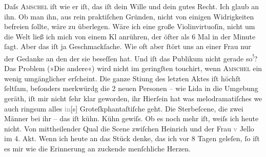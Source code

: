 \pstart
           Daſs \textsc{Amschel} iſt wie er iſt, das iſt dein Wille und dein gutes Recht. Ich glaub an ihn. Ob
               man ihn, aus rein praktiſchen Gründen, nicht von einigen Widrigkeiten befreien{ }ſollte,  wäre zu überlegen. Wäre ich eine große
               Violinvirtuoſin, nicht um die Welt ließ ich mich von einem Kl anrühren, der öfter als 6 Mal in der Minute \label{K_L01534-2v}\label{K_L01534-2}{ }ſagt. Aber das iſt ja Geschmackſache. Wie oft aber{ }ſtört uns an einer {\pb}Frau nur der Gedanke an den der sie beseſſen hat. Und iſt das Publikum nicht gerade so\substVorne{}\textsuperscript{!}\substDazwischen{}?\substHinten{} Das Problem (»Die andere«) wird nicht
               im geringſten touchirt, wenn \textsc{Amschel} ein wenig umgänglicher erſcheint. Die ganze Sti{\geminationm}ung des letzten Aktes iſt höchſt{ }ſeltſam, beſonders merkwürdg die 2 neuen Personen
               – wie Lida in die Umgebung
               geräth, iſt mir nicht{ }ſehr klar geworden,  ihr
               Hierſein hat was melodramatiſches {\pb}we{\geminationn} auch ringsum alles
                  \textcolor{gray}{in}{[}s{]} Groteſkphantaſtiſche geht. Die Sterbeſcene, die zwei Männer
               bei ihr – das iſt kühn. Kühn gewiſs. Ob es noch mehr iſt, weiſs ich heute nicht. Von
               mittheilender Qual die Scene
               zwiſchen Heinrich und der Frau \textcolor{gray}{v} Jello
               im 4. Akt. Wenn ich heute an das Stück denke, das ich vor 8 Tagen geleſen,{ }ſo iſt es
               mir wie die Erinnerung an zuckende menſchliche Herzen.\pend
           
